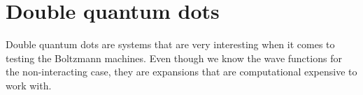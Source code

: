 \section{Double quantum dots}
Double quantum dots are systems that are very interesting when it comes to testing the Boltzmann machines. Even though we know the wave functions for the non-interacting case, they are expansions that are computational expensive to work with.


